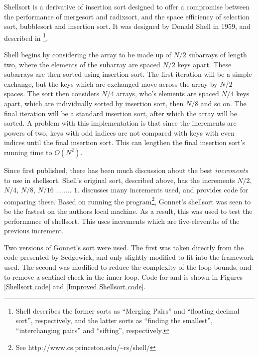 \label{shell}

Shellsort is a derivative of insertion sort designed to offer a compromise
between the performance of mergesort and radixsort, and the space efficiency of
selection sort, bubblesort and insertion sort. It was designed by Donald Shell
in 1959, and described in \cite{Shell59}\footnote{Shell describes the former
sorts as ``Merging Pairs'' and ``floating decimal sort'', respectively, and the
latter sorts as ``finding the smallest'', ``interchanging pairs'' and ``sifting'',
respectively.}.

Shell begins by considering the array to be made up of $N/2$ subarrays of
length two, where the elements of the subarray are spaced $N/2$ keys apart.
These subarrays are then sorted using insertion sort. The first iteration will
be a simple exchange, but the keys which are exchanged move across the array by
$N/2$ spaces. The sort then considers $N/4$ arrays, who's elements are spaced
$N/4$ keys apart, which are individually sorted by insertion sort, then $N/8$
and so on. The final iteration will be a standard insertion sort, after which
the array will be sorted. A problem with this implementation is that since the
increments are powers of two, keys with odd indices are not compared with keys
with even indices until the final insertion sort. This can lengthen the final
insertion sort's running time to $O(N^2)$.

Since first published, there has been much discussion about the best
\textit{increments} to use in shellsort. Shell's original sort, described above,
has the increments $N/2$, $N/4$, $N/8$, $N/16$ ........ $1$. \cite{Sedgewick96}
discusses many increments used, and provides code for comparing these. Based on
running the  program\footnote{See
http://www.cs.princeton.edu/\textasciitilde{}rs/shell/}, Gonnet's shellsort was
seen to be the fastest on the authors local machine. As a result, this was used
to test the performance of shellsort. This uses increments which are
five-elevenths of the previous increment.

Two versions of Gonnet's sort were used. The first was taken directly from the
code presented by Sedgewick, and only slightly modified to fit into the
framework used.  The second was modified to reduce the complexity of the loop
bounds, and to remove a sentinel check in the inner loop. Code for
 and  is shown in Figures \ref{Shellsort
code} and \ref{Improved Shellsort code}.


